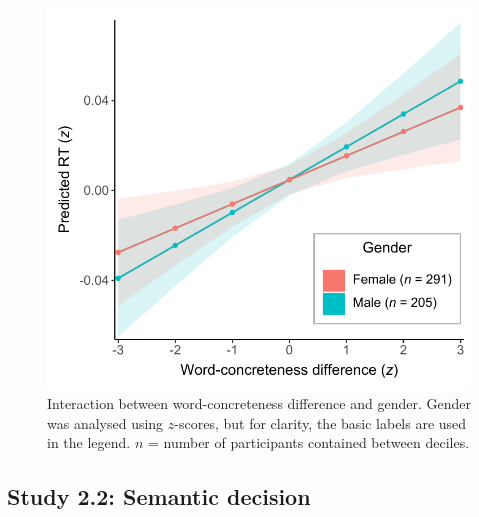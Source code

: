 \documentclass[
  12pt,
  man,floatsintext]{apa7}
\begin{document}
\begin{figure}

{\centering \includegraphics[width=0.7\linewidth]{../semanticpriming/frequentist_analysis/plots/semanticpriming-interaction-word-concreteness-difference-gender} 

}

\caption{Interaction between word-concreteness difference and gender. Gender was analysed using \(z\)-scores, but for clarity, the basic labels are used in the legend. \(n\) = number of participants contained between deciles.}\label{fig:semanticpriming-interaction-word-concreteness-difference-gender}
\end{figure}

\clearpage

\hypertarget{study-2.2-semantic-decision-4}{%
\subsection{Study 2.2: Semantic decision}\label{study-2.2-semantic-decision-4}}
\end{document}
